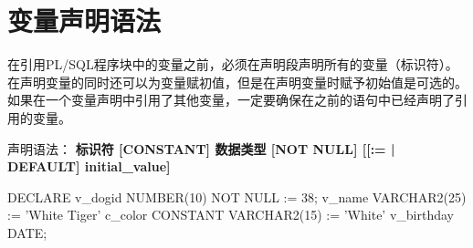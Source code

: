 \documentclass[11pt, a4paper, oneside, UTF8]{ctexbook}
\let\kaishu\relax %
\begin{document}
\section{变量声明语法}
在引用PL/SQL程序块中的变量之前，必须在声明段声明所有的变量（标识符）。
在声明变量的同时还可以为变量赋初值，但是在声明变量时赋予初始值是可选的。
如果在一个变量声明中引用了其他变量，一定要确保在之前的语句中已经声明了引用的变量。

声明语法：
{\bfseries\kaishu 标识符 [CONSTANT] 数据类型 [NOT NULL] [[:= | DEFAULT] initial\_value]}

\begin{plsql}[caption=PL/SQL变量声明语法示例]
DECLARE
  v_dogid NUMBER(10) NOT NULL := 38;
  v_name VARCHAR2(25) := 'White Tiger'
  c_color CONSTANT VARCHAR2(15) := 'White'
  v_birthday DATE;
\end{plsql}
\end{document}
